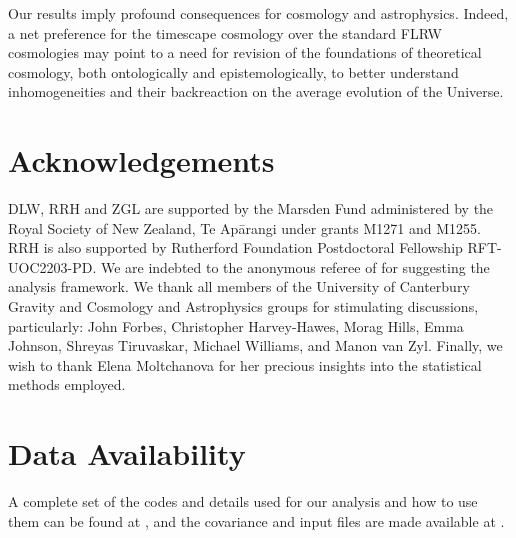 \documentclass[fleqn,usenatbib]{mnras}
\begin{document}
Our results imply profound consequences for cosmology and astrophysics. Indeed, a net preference for the timescape cosmology over the standard FLRW cosmologies may point to a need for revision of the foundations of theoretical cosmology, both ontologically and epistemologically, to better understand inhomogeneities and their backreaction on the average evolution of the Universe.

\section*{Acknowledgements}
DLW, RRH and ZGL are supported by the Marsden Fund administered by the Royal Society of New Zealand, Te Apārangi under grants M1271 and M1255. RRH is also supported by Rutherford Foundation Postdoctoral Fellowship RFT-UOC2203-PD. We are indebted to the anonymous referee of \citet{Lane_2023} for suggesting the analysis framework. We thank all members of the University of Canterbury Gravity and Cosmology and Astrophysics groups for stimulating discussions, particularly: John Forbes, Christopher Harvey-Hawes, Morag Hills, Emma Johnson, Shreyas Tiruvaskar, Michael Williams, and Manon van Zyl. Finally, we wish to thank Elena Moltchanova for her precious insights into the statistical methods employed.

\section*{Data Availability}

A complete set of the codes and details used for our analysis and how to use them can
be found at \citet{Seifert_2023}, and the covariance and input files are made available at \citet{Lane_2024}.





\bsp	
\label{lastpage}
\end{document}
